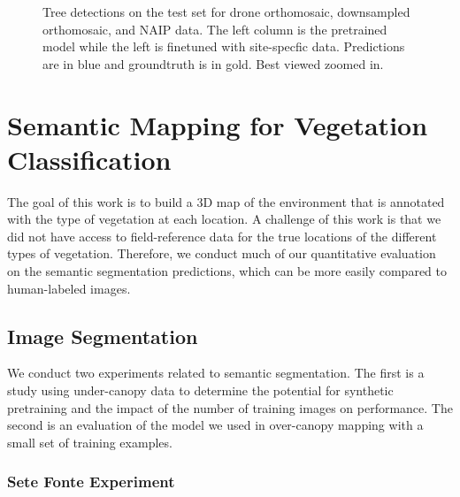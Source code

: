 \begin{figure}[H]
    \hfill
    \caption{
    Tree detections on the test set for drone orthomosaic, downsampled orthomosaic, and NAIP data. The left column is the pretrained model while the left is finetuned with site-specfic data. Predictions are in blue and groundtruth is in gold. Best viewed zoomed in.
    }
    \label{fig:results:tree_det}
\end{figure}


\section{Semantic Mapping for Vegetation Classification}
The goal of this work is to build a 3D map of the environment that is annotated with the type of vegetation at each location. A challenge of this work is that we did not have access to field-reference data for the true locations of the different types of vegetation. Therefore, we conduct much of our quantitative evaluation on the semantic segmentation predictions, which can be more easily compared to human-labeled images. 

\subsection{Image Segmentation}
We conduct two experiments related to semantic segmentation. The first is a study using under-canopy data to determine the potential for synthetic pretraining and the impact of the number of training images on performance. The second is an evaluation of the model we used in over-canopy mapping with a small set of training examples.
\subsubsection{Sete Fonte Experiment}

